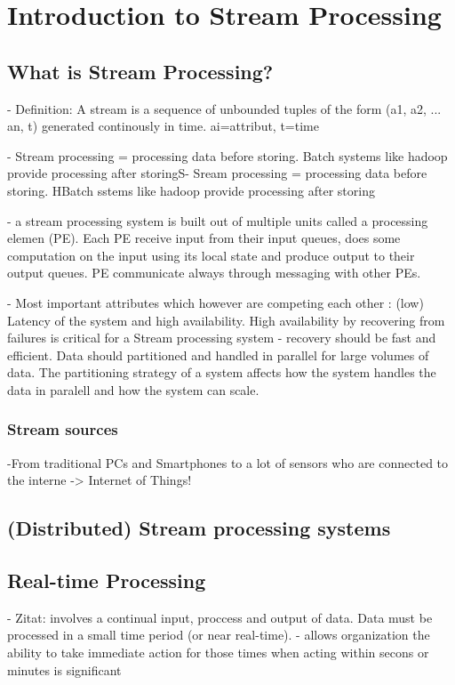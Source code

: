 \chapter{Introduction to Stream Processing}

\section{What is Stream Processing?}
- Definition: A stream is a sequence of unbounded tuples of the form (a1, a2,
... an, t) generated continously in time. ai=attribut, t=time

- Stream processing = processing data before storing. Batch systems like hadoop
provide processing after storingS- Sream processing = processing data before
storing. HBatch sstems like hadoop provide processing after storing  

- a stream processing system is built out of multiple units called a processing
elemen (PE). Each PE receive input from their input queues, does some
computation on the input using its local state and produce output to their
output queues. PE communicate always through messaging with other PEs.

- Most important attributes which however are competing each other : (low)
Latency of the system and high availability. High availability by recovering
from failures is critical for a Stream processing system - recovery should be
fast and efficient. Data should partitioned and handled in parallel for large
volumes of data. The partitioning strategy of a system  affects how the system
handles the data in paralell and how the system can scale. 

\subsection{Stream sources}
-From traditional PCs and Smartphones to a lot of sensors who are connected to
the interne -> Internet of Things!

\section{(Distributed) Stream processing systems}

\section{Real-time Processing}
- Zitat: involves a continual input, proccess and output of data. Data must be
processed in a small time period (or near real-time). 
- allows organization the ability to take immediate action for those times when
acting within secons or minutes is significant\\

